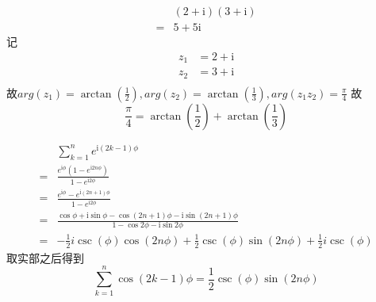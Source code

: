 \documentclass{phyasgn}
\renewcommand{\i}{\mathrm{i}}
\begin{document}
\begin{sol}[2]
    $$\begin{aligned}
        &(2+\i)(3+\i)\\
        =&5+5\i
    \end{aligned}$$
    记
    $$\begin{aligned}
        z_1&=2+\i\\
        z_2&=3+\i\\
    \end{aligned}$$
    故$arg(z_1)=\arctan(\frac{1}{2}),arg(z_2)=\arctan(\frac{1}{3}),arg(z_1z_2)=\frac{\pi}{4}$
    故
    $$\frac{\pi}{4}=\arctan(\frac{1}{2})+\arctan(\frac{1}{3})$$
\end{sol}\par

\begin{sol}[3]
    $$\begin{aligned}
        &\sum_{k=1}^{n}e^{\i(2k-1)\phi}\\
        =&\frac{e^{\i\phi}(1-e^{\i 2n\phi})}{1-e^{\i 2\phi}}\\
        =&\frac{e^{\i\phi}-e^{\i (2n+1)\phi}}{1-e^{\i 2\phi}}\\
        =&\frac{\cos\phi+\i\sin\phi-\cos(2n+1)\phi-\i\sin(2n+1)\phi}{1-\cos2\phi-\i\sin2\phi}\\
        =&-\frac{1}{2} i \csc (\phi ) \cos (2 n \phi )+\frac{1}{2}
        \csc (\phi ) \sin (2 n \phi )+\frac{1}{2} i \csc
        (\phi )
    \end{aligned}$$
    取实部之后得到
    $$\sum_{k=1}^{n}\cos(2k-1)\phi=\frac{1}{2}
        \csc (\phi ) \sin (2 n \phi )$$
\end{sol}\par
\end{document}

